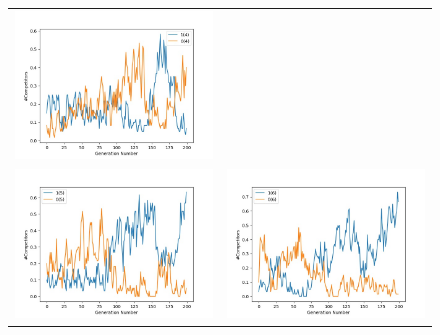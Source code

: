 \documentclass{article}
\begin{document}
\begin{figure}[H]
\begin{adjustbox}{width=0.6\paperwidth}
\begin{tabular}{c c}
			\includegraphics{Codes/Problem_2 Construction_2/Comp_4.jpg} \\ \includegraphics{Codes/Problem_2 Construction_2/Comp_5.jpg} &
			\includegraphics{Codes/Problem_2 Construction_2/Comp_6.jpg}\\

\end{tabular}
\end{adjustbox}
\end{figure}
\end{document}
